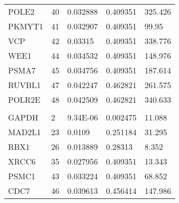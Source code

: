 \begin{longtable}{>{\baselineskip=16pt}p{3cm} >{\baselineskip=16pt}p{1cm}  >{\baselineskip=16pt}p{3cm}   >{\baselineskip=16pt}p{3cm} >{\baselineskip=16pt}p{3cm}}
POLE2 & 40 & 0.032888 & 0.409351 & 325.426 \\
PKMYT1 & 41 & 0.032907 & 0.409351 & 99.95 \\
VCP & 42 & 0.03315 & 0.409351 & 338.776 \\
WEE1 & 44 & 0.034532 & 0.409351 & 148.976 \\
PSMA7 & 45 & 0.034756 & 0.409351 & 187.614 \\
RUVBL1 & 47 & 0.042247 & 0.462821 & 261.575 \\
POLR2E & 48 & 0.042509 & 0.462821 & 340.633 \\
 \hline
 \multicolumn{5}{|c|}{HCT116-dependent fitness genes} \\
 \hline
GAPDH & 2 & 9.34E-06 & 0.002475 & 11.088 \\
MAD2L1 & 23 & 0.0109 & 0.251184 & 31.295 \\
RBX1 & 26 & 0.013889 & 0.28313 & 8.352 \\
XRCC6 & 35 & 0.027956 & 0.409351 & 13.343 \\
PSMC1 & 43 & 0.033224 & 0.409351 & 68.852 \\
CDC7 & 46 & 0.039613 & 0.456414 & 147.986 \\

\end{longtable}




